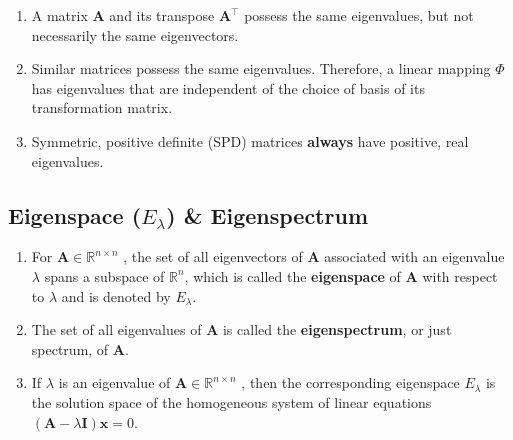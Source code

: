 \begin{enumerate}
    \item A matrix $\bm{A}$ and its transpose $\bm{A}^\top$ possess the same eigenvalues, but not necessarily the same eigenvectors.
    \hfill \cite{mfml/book/mml/Deisenroth-Faisal-Ong}

    \item Similar matrices possess the same eigenvalues.
    Therefore, a linear mapping $\Phi$ has eigenvalues that are independent of the choice of basis of its transformation matrix.
    \hfill \cite{mfml/book/mml/Deisenroth-Faisal-Ong}

    \item Symmetric, positive definite (SPD) matrices \textbf{always} have positive, real eigenvalues.
    \hfill \cite{mfml/book/mml/Deisenroth-Faisal-Ong}
\end{enumerate}




\subsection{Eigenspace ($E_\lambda $) \& Eigenspectrum}

\begin{enumerate}
    \item 
    \begin{definition}[Eigenspace]
        For $\bm{A} \in \mathbb{R}^{n\times n}$ , the set of all eigenvectors of $\bm{A}$ associated with an eigenvalue $\lambda $ spans a subspace of $\mathbb{R}^n$, which is called the \textbf{eigenspace} of $\bm{A}$ with respect to $\lambda $ and is denoted by $E_\lambda $.
        \hfill \cite{mfml/book/mml/Deisenroth-Faisal-Ong}
    \end{definition}

    \item 
    \begin{definition}[Eigenspectrum]
        The set of all eigenvalues of $\bm{A}$ is called the \textbf{eigenspectrum}, or just spectrum, of $\bm{A}$.
        \hfill \cite{mfml/book/mml/Deisenroth-Faisal-Ong}
    \end{definition}

    \item If $\lambda $ is an eigenvalue of $\bm{A} \in \mathbb{R}^{n\times n}$ , then the corresponding eigenspace $E_\lambda $ is the solution space of the homogeneous system of linear equations $(\bm{A} - \lambda \bm{I})\bm{x} = 0$.
    \hfill \cite{mfml/book/mml/Deisenroth-Faisal-Ong}
\end{enumerate}



